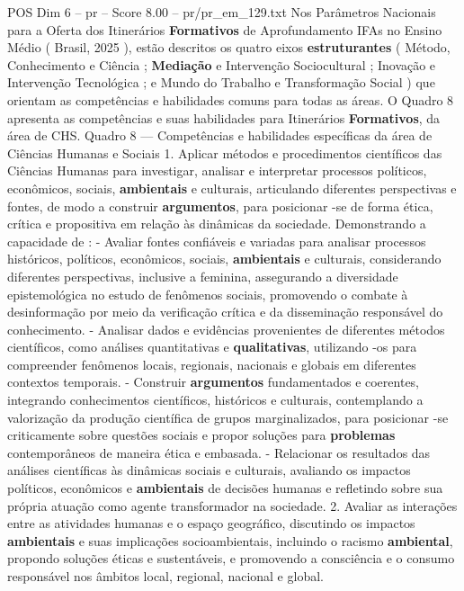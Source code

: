 \begin{textsample}{POS Dim 6 – pr – Score 8.00 – pr/pr\_em\_129.txt}
Nos Parâmetros Nacionais para a Oferta dos Itinerários \textbf{Formativos} de Aprofundamento IFAs no Ensino Médio ( Brasil, 2025 ), estão descritos os quatro eixos \textbf{estruturantes} ( Método, Conhecimento e Ciência ; \textbf{Mediação} e Intervenção Sociocultural ; Inovação e Intervenção Tecnológica ; e Mundo do Trabalho e Transformação Social ) que orientam as competências e habilidades comuns para todas as áreas.
O Quadro 8 apresenta as competências e suas habilidades para Itinerários \textbf{Formativos}, da área de CHS.
Quadro 8 — Competências e habilidades específicas da área de Ciências Humanas e Sociais 1.
Aplicar métodos e procedimentos científicos das Ciências Humanas para investigar, analisar e interpretar processos políticos, econômicos, sociais, \textbf{ambientais} e culturais, articulando diferentes perspectivas e fontes, de modo a construir \textbf{argumentos}, para posicionar -se de forma ética, crítica e propositiva em relação às dinâmicas da sociedade.
Demonstrando a capacidade de : - Avaliar fontes confiáveis e variadas para analisar processos históricos, políticos, econômicos, sociais, \textbf{ambientais} e culturais, considerando diferentes perspectivas, inclusive a feminina, assegurando a diversidade epistemológica no estudo de fenômenos sociais, promovendo o combate à desinformação por meio da verificação crítica e da disseminação responsável do conhecimento. - Analisar dados e evidências provenientes de diferentes métodos científicos, como análises quantitativas e \textbf{qualitativas}, utilizando -os para compreender fenômenos locais, regionais, nacionais e globais em diferentes contextos temporais. - Construir \textbf{argumentos} fundamentados e coerentes, integrando conhecimentos científicos, históricos e culturais, contemplando a valorização da produção científica de grupos marginalizados, para posicionar -se criticamente sobre questões sociais e propor soluções para \textbf{problemas} contemporâneos de maneira ética e embasada. - Relacionar os resultados das análises científicas às dinâmicas sociais e culturais, avaliando os impactos políticos, econômicos e \textbf{ambientais} de decisões humanas e refletindo sobre sua própria atuação como agente transformador na sociedade. 2.
Avaliar as interações entre as atividades humanas e o espaço geográfico, discutindo os impactos \textbf{ambientais} e suas implicações socioambientais, incluindo o racismo \textbf{ambiental}, propondo soluções éticas e sustentáveis, e promovendo a consciência e o consumo responsável nos âmbitos local, regional, nacional e global.

\end{textsample}
